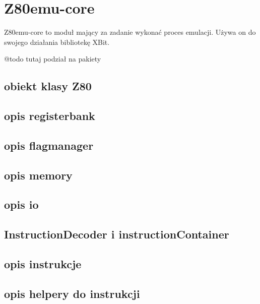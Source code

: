 \section{Z80emu-core}
Z80emu-core to moduł mający za zadanie wykonać proces emulacji. Używa on do swojego działania bibliotekę XBit.

@todo tutaj podział na pakiety

\subsection{obiekt klasy Z80}

\subsection{opis registerbank}

\subsection{opis flagmanager}

\subsection{opis memory}

\subsection{opis io}

\subsection{InstructionDecoder i instructionContainer}

\subsection{opis instrukcje}

\subsection{opis helpery do instrukcji}
